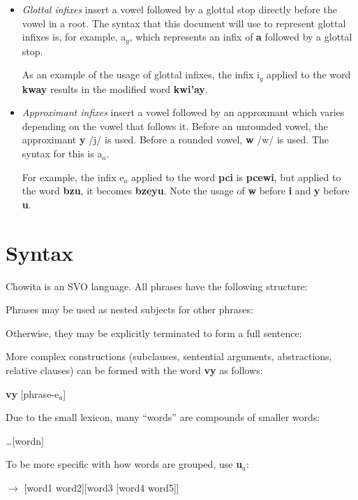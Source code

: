 \documentclass{article}
\newcommand{\ex}[2]{\noindent#1\bigskip\par#2\bigskip}
\begin{document}
\begin{itemize}

    \item \emph{Glottal infixes} insert a vowel followed by a glottal stop
        directly before the vowel in a root. The syntax that this document will
        use to represent glottal infixes is, for example, a$_g$, which
        represents an infix of \textbf{a} followed by a glottal stop.

        As an example of the usage of glottal infixes, the infix i$_g$ applied
        to the word \textbf{kway} results in the modified word \textbf{kwi'ay}.

    \item \emph{Approximant infixes} insert a vowel followed by an approxmant
        which varies depending on the vowel that follows it. Before an
        unrounded vowel, the approximant \textbf{y} /j/ is used. Before a
        rounded vowel, \textbf{w} /w/ is used. The syntax for this is a$_a$.

        For example, the infix e$_a$ applied to the word \textbf{pci} is
        \textbf{pcewi}, but applied to the word \textbf{bzu}, it becomes
        \textbf{bzeyu}. Note the usage of \textbf{w} before \textbf{i} and
        \textbf{y} before \textbf{u}.

\end{itemize}

\section{Syntax}

\ex{%
Chowita is an SVO language. All phrases have the following structure:
}{
[subject-a$_a$] [verb-a$_a$] [direct object]
}

\ex{%
Phrases may be used as nested subjects for other phrases:
}{
[phrase-a$_a$] [verb-a$_a$] [direct object]
}

\ex{%
Otherwise, they may be explicitly terminated to form a full sentence:
}{
[phrase-e$_a$]
}

\ex{%
More complex constructions (subclauses, sentential arguments, abstractions,
relative clauses) can be formed with the word \textbf{vy} as follows:
}{
\textbf{vy} [phrase-e$_a$]
}

\ex{%
Due to the small lexicon, many ``words'' are compounds of smaller words:
}{
[word1][word2]\ldots[wordn]
}

\ex{%
To be more specific with how words are grouped, use \textbf{u$_a$}:
}{
[word1][word2-u$_a$][word3][word4-u$_a$][word5-u$_a$u$_a$]

$\to$ [word1 word2][word3 [word4 word5]]
}
\end{document}

